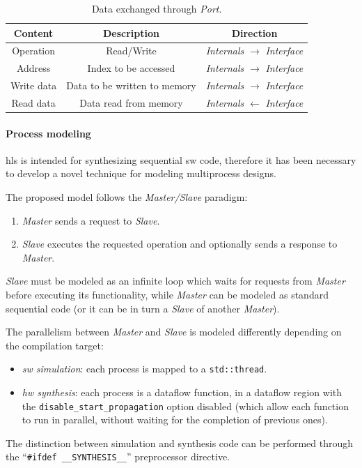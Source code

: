 \documentclass[11pt,a4paper,oneside]{memoir}
\begin{document}
\begin{table}[!htb]
	\begin{center}
		\begin{tabular}{ccc}
			\hline
			\rowcolor{gray!50}
			\textbf{Content} & \textbf{Description} &
			\textbf{Direction} \\
			\hline
			Operation & Read/Write &
			\emph{Internals} $\rightarrow$ \emph{Interface} \\
			\rowcolor{gray!25}
			Address & Index to be accessed &
			\emph{Internals} $\rightarrow$ \emph{Interface} \\
			Write data & Data to be written to memory &
			\emph{Internals} $\rightarrow$ \emph{Interface} \\
			\rowcolor{gray!25}
			Read data & Data read from memory &
			\emph{Internals} $\leftarrow$ \emph{Interface} \\
			\hline
		\end{tabular}
	\end{center}
	\caption{Data exchanged through \emph{Port}.}
	\label{tab:port}
\end{table}

\paragraph{Process modeling}
\ac{hls} is intended for synthesizing sequential \acl{sw} code, therefore it has
been necessary to develop a novel technique for modeling multiprocess designs.

The proposed model follows the \emph{Master/Slave} paradigm:
\begin{enumerate}
	\item \emph{Master} sends a request to \emph{Slave}.
	\item \emph{Slave} executes the requested operation and optionally sends
		a response to \emph{Master}.
\end{enumerate}

\emph{Slave} must be modeled as an infinite loop which waits for requests from
\emph{Master} before executing its functionality, while \emph{Master} can be
modeled as standard sequential code (or it can be in turn a \emph{Slave} of
another \emph{Master}).

The parallelism between \emph{Master} and \emph{Slave} is modeled differently
depending on the compilation target:
\begin{itemize}
	\item \emph{\ac{sw} simulation}: each process is mapped to a
		\texttt{std::thread}.
	\item \emph{\ac{hw} synthesis}: each process is a dataflow function, in
		a dataflow region with the \texttt{disable\_start\_propagation}
		option disabled (which allow each function to run in parallel,
		without waiting for the completion of previous ones).
\end{itemize}
The distinction between simulation and synthesis code can be performed through
the ``\texttt{\#ifdef \_\_SYNTHESIS\_\_}'' preprocessor directive.
\end{document}
